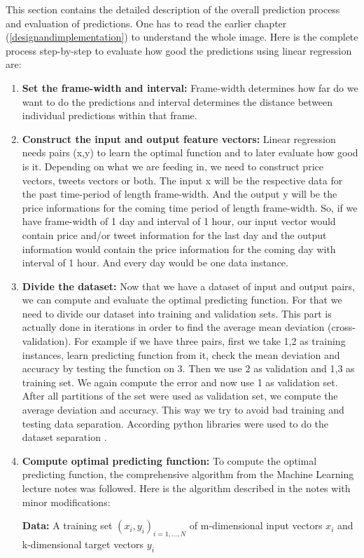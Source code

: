 \documentclass[a4paper,11pt,oneside]{article}
\begin{document}
 This section contains the detailed description of the overall prediction process and evaluation of predictions. One has to read the earlier chapter (\ref{designandimplementation}) to understand the whole image. Here is the complete process step-by-step to evaluate how good the predictions using linear regression are:
  \begin{enumerate}
  	\item {\bf Set the frame-width and interval:} Frame-width determines how far do we want to do the predictions and interval determines the distance between individual predictions within that frame.
  	\item {\bf Construct the input and output feature vectors:} Linear regression needs pairs (x,y) to learn the optimal function and to later evaluate how good is it. Depending on what we are feeding in, we need to construct price vectors, tweets vectors or both. The input x will be the respective data for the past time-period of length frame-width. And the output y will be the price informations for the coming time period of length frame-width. So, if we have frame-width of 1 day and interval of 1 hour, our input vector would contain price and/or tweet information for the last day and the output information would contain the price information for the coming day with interval of 1 hour. And every day would be one data instance. 
  	\item {\bf Divide the dataset:} Now that we have a dataset of input and output pairs, we can compute and evaluate the optimal predicting function. For that we need to divide our dataset into training and validation sets. This part is actually done in iterations in order to find the average mean deviation (cross-validation). For example if we have three pairs, first we take 1,2 as training instances, learn predicting function from it, check the mean deviation and accuracy by testing the function on 3. Then we use 2 as validation and 1,3 as training set. We again compute the error and now use 1 as validation set. After all partitions of the set were used as validation set, we compute the average deviation and accuracy. This way we try to avoid bad training and testing data separation. According python libraries were used to do the dataset separation \cite{pythonkfold}.
  	
  	\item {\bf Compute optimal predicting function: } To compute the optimal predicting function, the comprehensive algorithm  from the Machine Learning lecture notes was followed. Here is the algorithm described in the notes \cite{mllecturenotes} with minor modifications:
  	\begin{center}
  		\parbox{300pt}{
  			{\bf Data:} A training set $(x_i, y_i)_{i=1,...,N}$ of m-dimensional input vectors $x_i$ and k-dimensional target vectors $y_i$ 
  			
}
\end{center}
\end{enumerate}
\end{document}

